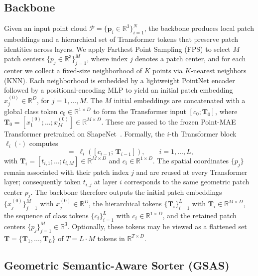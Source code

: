 \subsection{Backbone}

Given an input point cloud \(\mathcal{P} = \{\mathbf{p}_i\in\mathbb{R}^3\}_{i=1}^N\), the backbone produces local patch embeddings and a hierarchical set of Transformer tokens that preserve patch identities across layers. We apply Farthest Point Sampling (FPS) to select \(M\) patch centers \(\{p_j\in\mathbb{R}^3\}_{j=1}^M\), where index \(j\) denotes a patch center, and for each center we collect a fixed-size neighborhood of \(K\) points via \(K\)-nearest neighbors (KNN). Each neighborhood is embedded by a lightweight PointNet encoder followed by a positional-encoding MLP to yield an initial patch embedding \(x_j^{(0)}\in\mathbb{R}^D\), for \(j=1,\dots,M\). The \(M\) initial embeddings are concatenated with a global class token \(c_0\in\mathbb{R}^{1\times D}\) to form the Transformer input \([c_0;\mathbf{T}_0]\), where \(\mathbf{T}_0=[x_1^{(0)};\dots;x_M^{(0)}]\in\mathbb{R}^{M\times D}\). These are passed to the frozen Point-MAE Transformer pretrained on ShapeNet~\cite{pang2022masked,chang2015shapenet}. Formally, the \(i\)-th Transformer block \(\ell_i(\cdot)\) computes
\begin{equation}
[c_i;\,\mathbf{T}_i] \;=\; \ell_i([c_{i-1};\,\mathbf{T}_{i-1}]), \qquad i=1,\dots,L,
\end{equation}
with \(\mathbf{T}_i=[t_{i,1};\dots;t_{i,M}]\in\mathbb{R}^{M\times D}\) and \(c_i\in\mathbb{R}^{1\times D}\). The spatial coordinates \(\{p_j\}\) remain associated with their patch index \(j\) and are reused at every Transformer layer; consequently token \(t_{i,j}\) at layer \(i\) corresponds to the same geometric patch center \(p_j\). The backbone therefore outputs the initial patch embeddings \(\{x_j^{(0)}\}_{j=1}^M\) with \(x_j^{(0)}\in\mathbb{R}^D\), the hierarchical tokens \(\{\mathbf{T}_i\}_{i=1}^L\) with \(\mathbf{T}_i\in\mathbb{R}^{M\times D}\), the sequence of class tokens \(\{c_i\}_{i=1}^L\) with \(c_i\in\mathbb{R}^{1\times D}\), and the retained patch centers \(\{p_j\}_{j=1}^M\in\mathbb{R}^3\). Optionally, these tokens may be viewed as a flattened set \(\mathbf{T}=\{\mathbf{T}_1,\dots,\mathbf{T}_L\}\) of \(T=L\cdot M\) tokens in \(\mathbb{R}^{T\times D}\).

\subsection{Geometric Semantic-Aware Sorter (GSAS)}
\label{sec:gsas}

